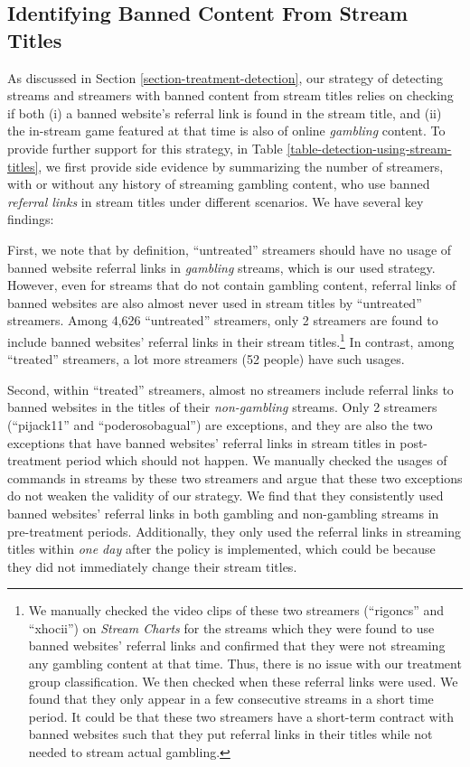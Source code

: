 \documentclass[a4paper,12pt]{article}
\begin{document}
\subsection{Identifying Banned Content From Stream Titles} \label{appendix-treatment-detection-title}

As discussed in Section \ref{section-treatment-detection}, our strategy of detecting streams and streamers with banned content from stream titles relies on checking if both (i) a banned website's referral link is found in the stream title, and (ii) the in-stream game featured at that time is also of online \textit{gambling} content. To provide further support for this strategy, in Table \ref{table-detection-using-stream-titles}, we first provide side evidence by summarizing the number of streamers, with or without any history of streaming gambling content, who use banned \textit{referral links} in stream titles under different scenarios. We have several key findings:


First, we note that by definition, ``untreated'' streamers should have no usage of banned website referral links in \textit{gambling} streams, which is our used strategy. However, even for streams that do not contain gambling content, referral links of banned websites are also almost never used in stream titles by ``untreated'' streamers. Among 4,626 ``untreated'' streamers, only 2 streamers are found to include banned websites' referral links in their stream titles.\footnote{We manually checked the video clips of these two streamers (``rigoncs'' and ``xhocii'') on \textit{Stream Charts} for the streams which they were found to use banned websites' referral links and confirmed that they were not streaming any gambling content at that time. Thus, there is no issue with our treatment group classification. We then checked when these referral links were used. We found that they only appear in a few consecutive streams in a short time period. It could be that these two streamers have a short-term contract with banned websites such that they put referral links in their titles while not needed to stream actual gambling.} In contrast, among ``treated'' streamers, a lot more streamers (52 people) have such usages. 

Second, within ``treated'' streamers, almost no streamers include referral links to banned websites in the titles of their \textit{non-gambling} streams. Only 2 streamers (``pijack11'' and ``poderosobagual'') are exceptions, and they are also the two exceptions that have banned websites' referral links in stream titles in post-treatment period which should not happen. We manually checked the usages of commands in streams by these two streamers and argue that these two exceptions do not weaken the validity of our strategy. We find that they consistently used banned websites' referral links in both gambling and non-gambling streams in pre-treatment periods. Additionally, they only used the referral links in streaming titles within \textit{one day} after the policy is implemented, which could be because they did not immediately change their stream titles. 
\end{document}

